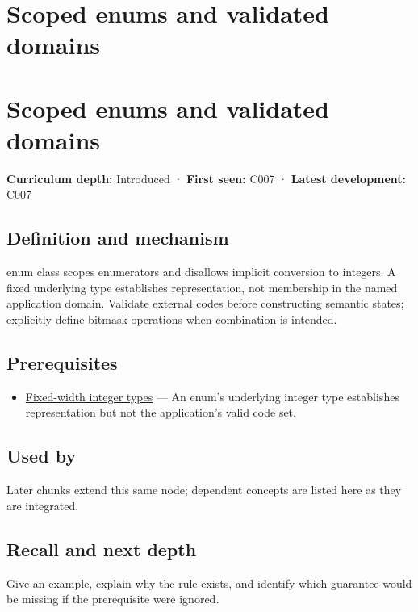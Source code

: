 \hypertarget{appendix-23640fcee147}{}
\section*{Scoped enums and validated domains}
\section{Scoped enums and validated domains}\label{scoped-enums-and-validated-domains}

\textbf{Curriculum depth:} Introduced · \textbf{First seen:} C007 · \textbf{Latest development:} C007

\subsection{Definition and mechanism}\label{definition-and-mechanism}

enum class scopes enumerators and disallows implicit conversion to integers. A fixed underlying type establishes representation, not membership in the named application domain. Validate external codes before constructing semantic states; explicitly define bitmask operations when combination is intended.

\subsection{Prerequisites}\label{prerequisites}

\begin{itemize}
\tightlist
\item
  \hyperref[appendix-cc04044b5782]{Fixed-width integer types} --- An enum's underlying integer type establishes representation but not the application's valid code set.
\end{itemize}

\subsection{Used by}\label{used-by}

Later chunks extend this same node; dependent concepts are listed here as they are integrated.

\subsection{Recall and next depth}\label{recall-and-next-depth}

Give an example, explain why the rule exists, and identify which guarantee would be missing if the prerequisite were ignored.

